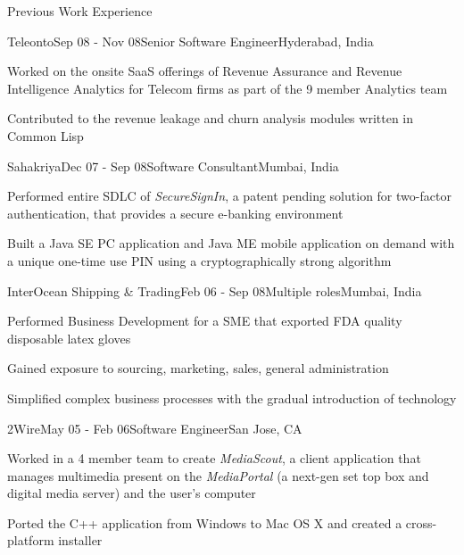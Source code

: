 \documentclass{resume} %
\begin{document}
\begin{rSection}{Previous Work Experience}

\begin{rSubsection}{Teleonto}{Sep 08 - Nov 08}{Senior Software Engineer}{Hyderabad, India}
\item Worked on the onsite SaaS offerings of Revenue Assurance and Revenue Intelligence Analytics for Telecom firms as part of the 9 member Analytics team
\item Contributed to the revenue leakage and churn analysis modules written in Common Lisp
\end{rSubsection}


\begin{rSubsection}{Sahakriya}{Dec 07 - Sep 08}{Software Consultant}{Mumbai, India}
\item Performed entire SDLC of {\em SecureSignIn}, a patent pending solution for two-factor authentication, that provides a secure e-banking environment
\item Built a Java SE PC application and Java ME mobile application on demand with a unique one-time use PIN using a cryptographically strong algorithm
\end{rSubsection}


\begin{rSubsection}{InterOcean Shipping \& Trading}{Feb 06 - Sep 08}{Multiple roles}{Mumbai, India}
\item Performed Business Development for a SME that exported FDA quality disposable latex gloves
\item Gained exposure to sourcing, marketing, sales, general administration
\item Simplified complex business processes with the gradual introduction of technology
\end{rSubsection}



\begin{rSubsection}{2Wire}{May 05 - Feb 06}{Software Engineer}{San Jose, CA}
\item Worked in a 4 member team to create {\em MediaScout}, a client
  application that manages multimedia present on the {\em MediaPortal}
  (a next-gen set top box and digital media server) and the user's computer
\item Ported the C++ application from Windows to Mac OS X and created a cross-platform installer
\end{rSubsection}

\end{rSection}
\end{document}
